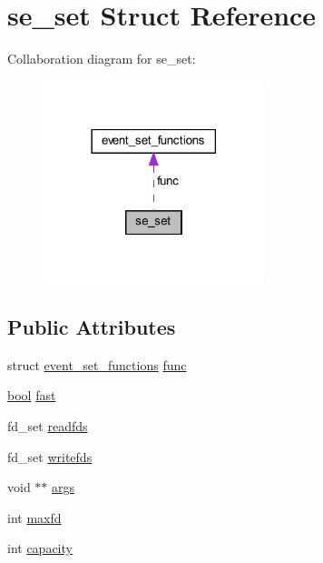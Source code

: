 \hypertarget{structse__set}{}\section{se\+\_\+set Struct Reference}
\label{structse__set}


Collaboration diagram for se\+\_\+set\+:
\nopagebreak
\begin{figure}[H]
\begin{center}
\leavevmode
\includegraphics[width=182pt]{structse__set__coll__graph}
\end{center}
\end{figure}
\subsection*{Public Attributes}
\begin{DoxyCompactItemize}
\item 
struct \hyperlink{structevent__set__functions}{event\+\_\+set\+\_\+functions} \hyperlink{structse__set_a8544306ac8186a9a95e8354cb3694bf4}{func}
\item 
\hyperlink{automatic_8c_abb452686968e48b67397da5f97445f5b}{bool} \hyperlink{structse__set_a455761d7a57f96c362b21662020c4bec}{fast}
\item 
fd\+\_\+set \hyperlink{structse__set_ad1cb2f201590bb23bb61881fbe4ddf61}{readfds}
\item 
fd\+\_\+set \hyperlink{structse__set_a79de681d5da8c3a51b9db03f4ddfe7e6}{writefds}
\item 
void $\ast$$\ast$ \hyperlink{structse__set_ab9ecd80c456aecaa6cb0067cc16e503e}{args}
\item 
int \hyperlink{structse__set_ab00550b034fbc8a2b8ff54294b5ddcf5}{maxfd}
\item 
int \hyperlink{structse__set_a8ca7f4830c70077cd476d2a552e88861}{capacity}
\end{DoxyCompactItemize}


